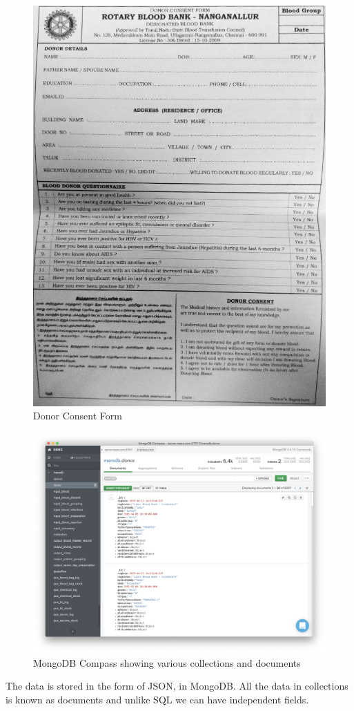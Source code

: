 \documentclass[BTech]{srmuthesis}
\begin{document}
\begin{figure}[H] 
	\centering
	\includegraphics[scale=0.63]{register_page.jpeg}
	\caption{Donor Consent Form}
\end{figure}
\begin{figure}[H]
	\centering
	\includegraphics[scale=0.32]{mongo_compass.png}
	\caption{MongoDB Compass showing various collections and documents}
\end{figure}
The data is stored in the form of \ac{JSON}, in MongoDB. All the data in collections is known as documents and unlike SQL we can have independent fields.
\end{document}

